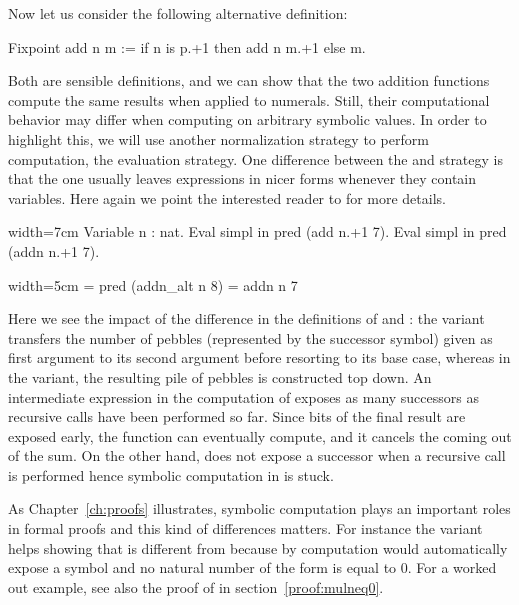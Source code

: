 Now let us consider the following alternative definition:

\begin{coq}{}{}
Fixpoint add n m := if n is p.+1 then add n m.+1 else m.
\end{coq}

Both are sensible definitions, and we can show that the two addition
functions compute the same results when applied to numerals.  Still,
their computational behavior may differ when computing on arbitrary
symbolic values. In order to highlight this, we will use another
normalization strategy to perform computation, the 
evaluation strategy.  One difference between the 
and  strategy is that the  one usually leaves
expressions in nicer forms whenever they contain variables. Here again
we point the interested reader to \cite[Section 8.7.1]{Coq:manual} for
more details.

\begin{coq}{}{width=7cm}
Variable n : nat.
Eval simpl in pred (add  n.+1 7).
Eval simpl in pred (addn n.+1 7).
\end{coq}
\begin{coqout}{}{width=5cm}
= pred (addn_alt n 8)
= addn n 7
\end{coqout}

Here we see the impact of the difference in the definitions of
 and : the  variant transfers the
number of pebbles (represented by the successor  symbol)
given as first argument to its second argument
before resorting to its base case, whereas in the  variant,
the resulting pile of pebbles is constructed top down. An intermediate
expression in the computation of  exposes as many
successors as recursive calls have been performed so far. Since bits
of the final result are exposed early, the  function can
eventually compute, and it cancels the  coming out of the sum.
On the other hand,
 does not expose a successor when a recursive call is
performed hence symbolic computation in  is stuck.

As Chapter~\ref{ch:proofs} illustrates, symbolic computation plays an
important roles in formal proofs and this kind of differences
matters. For instance the  variant helps
showing that  is different from  because by
computation \Coq{} would automatically expose  a  symbol
and no natural number of the form  is equal to 0.
For a worked out example, see also the proof of  in
section~\ref{proof:mulneq0}.



